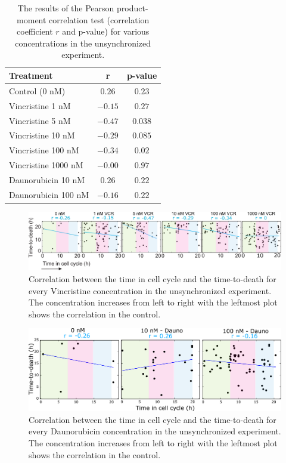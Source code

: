 \documentclass[pdftex,12pt,a4paper]{report}
\begin{document}
\begin{table}[H]
\centering
\begin{tabular}{ l | c | c}
\hline
Treatment & r & p-value \\
\hline\hline
Control (0 nM) & $0.26$ & $0.23$ \\
Vincristine 1 nM & $-0.15$ & $0.27$ \\
Vincristine 5 nM & $-0.47$ & $0.038$ \\
Vincristine 10  nM & $-0.29$ & $0.085$ \\
Vincristine 100 nM & $-0.34$ & $0.02$ \\
Vincristine 1000 nM & $-0.00$ & $0.97$ \\
\hline
Daunorubicin 10 nM & $0.26$ & $0.22$ \\
Daunorubicin 100 nM & $-0.16$ & $0.22$ \\
\hline
\end{tabular}
\caption{The results of the Pearson product-moment correlation test (correlation coefficient $r$ and p-value) for various concentrations in the unsynchronized experiment.}
\label{table:unsyn_ttd_r_p}
\end{table}

\begin{figure}[H]
\centering
\includegraphics[width=\textwidth]{images/ttd/unsyn/vcr_scatter.pdf}
\caption[TIC vs TTD correlation for every Vincristine concentration in the unsynchronized experiment]{Correlation between the time in cell cycle and the time-to-death for every Vincristine concentration in the unsynchronized experiment. The concentration increases from left to right with the leftmost plot shows the correlation in the control.}
\label{fig:ttd_scatter_vcr}
\end{figure}

\begin{figure}[H]
\centering
\includegraphics[width=\textwidth]{images/ttd/unsyn/dauno_scatter.pdf}
\caption[TIC vs TTD correlation for every Daunorubicin concentration in the unsynchronized experiment]{Correlation between the time in cell cycle and the time-to-death for every Daunorubicin concentration in the unsynchronized experiment. The concentration increases from left to right with the leftmost plot shows the correlation in the control.}
\label{fig:ttd_scatter_dauno}
\end{figure}
\end{document}
